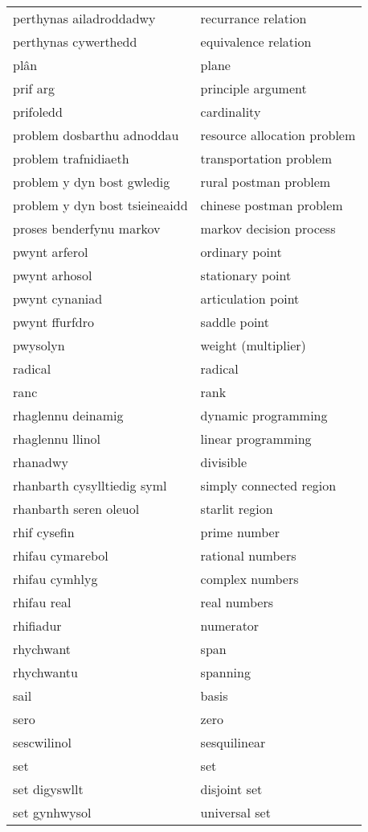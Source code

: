 \begin{supertabular}{p{0.22\textwidth}p{0.22\textwidth}}
perthynas ailadroddadwy & recurrance relation \\
perthynas cywerthedd & equivalence relation \\
plân & plane \\
prif arg & principle argument \\
prifoledd & cardinality \\
problem dosbarthu adnoddau & resource allocation problem \\
problem trafnidiaeth & transportation problem \\
problem y dyn bost gwledig & rural postman problem \\
problem y dyn bost tsieineaidd & chinese postman problem \\
proses benderfynu markov & markov decision process \\
pwynt arferol & ordinary point \\
pwynt arhosol & stationary point \\
pwynt cynaniad & articulation point \\
pwynt ffurfdro & saddle point \\
pwysolyn & weight (multiplier) \\
radical & radical \\
ranc & rank \\
rhaglennu deinamig & dynamic programming \\
rhaglennu llinol & linear programming \\
rhanadwy & divisible \\
rhanbarth cysylltiedig syml & simply connected region \\
rhanbarth seren oleuol & starlit region \\
rhif cysefin & prime number \\
rhifau cymarebol & rational numbers \\
rhifau cymhlyg & complex numbers \\
rhifau real & real numbers \\
rhifiadur & numerator \\
rhychwant & span \\
rhychwantu & spanning \\
sail & basis \\
sero & zero \\
sescwilinol & sesquilinear \\
set & set \\
set digyswllt & disjoint set \\
set gynhwysol & universal set \\

\end{supertabular}
